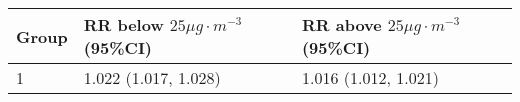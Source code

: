 \begin{tabular}{lll}
  \hline
Group & RR below $25 \mu g \cdot m^{-3}$ (95\%CI) & RR above $25 \mu g \cdot m^{-3}$ (95\%CI) \\ 
  \hline
   1 & 1.022 (1.017, 1.028) & 1.016 (1.012, 1.021) \\ 
   \hline
\end{tabular}

